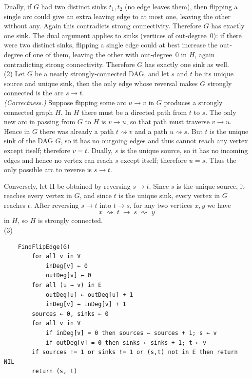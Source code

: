 \documentclass[letterpaper, 11pt]{article}
\newcommand{\1}{\mathds{1}}	%
\theoremstyle{definition}
\newenvironment{solution}{{\par\noindent\it Solution.}}{}
\begin{document}
\begin{solution}
Dually, if \(G\) had two distinct sinks \(t_1,t_2\) (no edge leaves them), then flipping a single arc could give an extra leaving edge to at most one, leaving the other without any.  Again this contradicts strong connectivity.  Therefore \(G\) has exactly one sink.
The dual argument applies to sinks (vertices of out‐degree 0): if there were two distinct sinks, flipping a single edge could at best increase the out‐degree of one of them, leaving the other with out‐degree 0 in \(H\), again contradicting strong connectivity.  Therefore \(G\) has exactly one sink as well.
\\(2)
Let \(G\) be a nearly strongly‐connected DAG, and let \(s\) and \(t\) be its unique source and unique sink, then the  only edge whose reversal makes \(G\) strongly connected is the arc \(s\to t\).
\\\emph{(Correctness.)}  
Suppose flipping some arc \(u\to v\) in \(G\) produces a strongly connected graph \(H\).  In \(H\) there must be a directed path from \(t\) to \(s\).  The only new arc in passing from \(G\) to \(H\) is \(v\to u\), so that path must traverse \(v\to u\).  Hence in \(G\) there was already a path \(t\rightsquigarrow v\) and a path \(u\rightsquigarrow s\).  But \(t\) is the unique sink of the DAG \(G\), so it has no outgoing edges and thus cannot reach any vertex except itself; therefore \(v=t\).  Dually, \(s\) is the unique source, so it has no incoming edges and hence no vertex can reach \(s\) except itself; therefore \(u=s\).  Thus the only possible arc to reverse is \(s\to t\).

Conversely,  let H be obtained by reversing \(s\to t\). Since \(s\) is the unique source, it reaches every vertex in \(G\), and since \(t\) is the unique sink, every vertex in \(G\) reaches \(t\).  After reversing \(s\to t\) into \(t\to s\), for any two vertices \(x,y\) we have
\[
  x \;\rightsquigarrow\; t \;\longrightarrow\; s \;\rightsquigarrow\; y
\]
in \(H\), so \(H\) is strongly connected.
\\(3)
\begin{lstlisting}
    FindFlipEdge(G)
        for all v in V
            inDeg[v] ← 0
            outDeg[v] ← 0
        for all (u → v) in E
            outDeg[u] ← outDeg[u] + 1
            inDeg[v] ← inDeg[v] + 1
        sources ← 0, sinks ← 0
        for all v in V
            if inDeg[v] = 0 then sources ← sources + 1; s ← v
            if outDeg[v] = 0 then sinks ← sinks + 1; t ← v
        if sources != 1 or sinks != 1 or (s,t) not in E then return NIL
        return (s, t)
    \end{lstlisting}
\end{solution}
\clearpage
\end{document}
